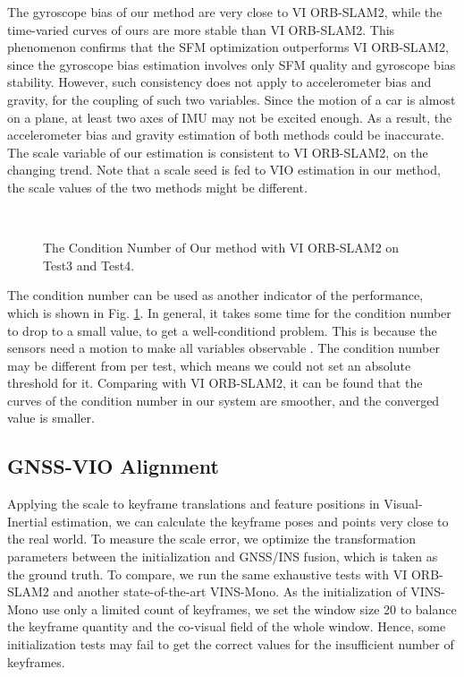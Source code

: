 \documentclass[journal,article,submit,moreauthors,pdftex]{Definitions/mdpi}
\begin{document}
The gyroscope bias of our method are very close to VI ORB-SLAM2, 
while the time-varied curves of ours are more stable than VI ORB-SLAM2.
This phenomenon confirms that the SFM optimization outperforms VI ORB-SLAM2, 
since the gyroscope bias estimation involves only SFM quality and 
gyroscope bias stability. 
However, such consistency does not apply to accelerometer bias and 
gravity, for the coupling of such two variables.
Since the motion of a car is almost on a plane, at least two axes of  
IMU may not be excited enough.
As a result, the accelerometer bias and gravity estimation of both 
methods could be inaccurate.
The scale variable of our estimation is consistent to VI ORB-SLAM2, on 
the changing trend.
Note that a scale seed is fed to VIO estimation in our method, the 
scale values of the two methods might be different.

\begin{figure}[H]
	\centering
\end{figure}
\begin{figure}[H]
	\centering
	 \\
	\caption{The Condition Number of Our method with VI ORB-SLAM2 on Test3 and Test4.}
	\label{VIOCond}
\end{figure}
The condition number can be used as another indicator of the performance,  
which is shown in Fig. \ref{VIOCond}.
In general, it takes some time for the condition number to drop to a 
small value, to get a well-conditiond problem.
This is because the sensors need a motion to make all variables 
observable \cite{mur-artalVisualInertialMonocularSLAM2017a}.
The condition number may be different from per test, which means we could 
not set an absolute threshold for it.
Comparing with VI ORB-SLAM2, it can be found that the curves of the 
condition number in our system are smoother, and the converged value 
is smaller. 


\subsection{GNSS-VIO Alignment}

Applying the scale to keyframe translations and feature positions in 
Visual-Inertial estimation, we can calculate the keyframe poses and 
points very close to the real world. 
To measure the scale error, we optimize the transformation parameters 
between the initialization and GNSS/INS fusion, which is taken as the 
ground truth.
To compare, we run the same exhaustive tests with VI ORB-SLAM2 and 
another state-of-the-art VINS-Mono\cite{qinVINSMonoRobustVersatile2017}.
As the initialization of VINS-Mono use only a limited count of keyframes, 
we set the window size 20 to balance the keyframe quantity and 
the co-visual field of the whole window.
Hence, some initialization tests may fail to get the correct values for 
the insufficient number of keyframes.
\end{document}
